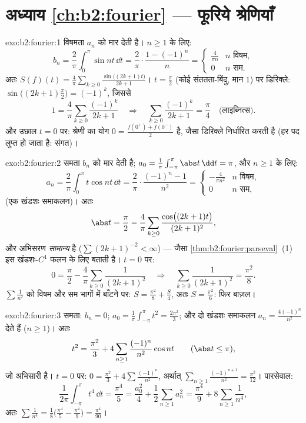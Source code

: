 \section*{अध्याय \ref{ch:b2:fourier} --- फूरिये श्रेणियाँ}

\begin{solution}{exo:b2:fourier:1}
विषमता $a_n$ को मार देती है। $n \geq 1$ के लिए:
\[
b_n = \frac{2}{\pi}\int_0^{\pi} \sin nt\,\dd t
= \frac{2}{\pi}\cdot\frac{1 - (-1)^n}{n}
= \begin{cases} \frac{4}{\pi n} & n \text{ विषम},\\ 0 & n
\text{ सम}. \end{cases}
\]
अतः $S(f)(t) = \frac{4}{\pi}\sum_{k\geq0} \frac{\sin\bigl((2k+1)t
\bigr)}{2k+1}$। $t = \frac\pi2$ (कोई संततता-बिंदु, मान $1$) पर डिरिक्ले: $\sin\bigl((2k+1)\frac\pi2\bigr) = (-1)^k$, जिससे
\[
1 = \frac4\pi \sum_{k\geq0}\frac{(-1)^k}{2k+1}
\quad\Longrightarrow\quad
\sum_{k\geq0}\frac{(-1)^k}{2k+1} = \frac{\pi}{4}
\quad\text{(लाइब्नित्स)}.
\]
और उछाल $t = 0$ पर: श्रेणी का योग $0 = \frac{f(0^+) +
f(0^-)}{2}$ है, जैसा डिरिक्ले निर्धारित करती है
(हर पद लुप्त हो जाता है: संगत)।
\end{solution}

\begin{solution}{exo:b2:fourier:2}
समता $b_n$ को मार देती है; $a_0 = \frac{1}{\pi}\int_{-\pi}^\pi\abs
t\,\dd t = \pi$, और $n \geq 1$ के लिए:
\[
a_n = \frac{2}{\pi}\int_0^\pi t\cos nt\,\dd t
= \frac{2}{\pi}\cdot\frac{(-1)^n - 1}{n^2}
= \begin{cases} -\frac{4}{\pi n^2} & n \text{ विषम},\\ 0 & n
\text{ सम}, \end{cases}
\]
(एक खंडशः समाकलन)। अतः
\[
\abs t = \frac{\pi}{2} - \frac{4}{\pi}\sum_{k\geq0}
\frac{\cos\bigl((2k+1)t\bigr)}{(2k+1)^2} ,
\]
और अभिसरण \emph{सामान्य} है ($\sum (2k+1)^{-2} < \infty$) --- जैसा \cref{thm:b2:fourier:parseval}~(1) इस  खंडशः-$C^1$
फलन के लिए बताती है। $t = 0$ पर:
\[
0 = \frac\pi2 - \frac4\pi\sum_{k\geq0}\frac{1}{(2k+1)^2}
\quad\Longrightarrow\quad
\sum_{k\geq0}\frac{1}{(2k+1)^2} = \frac{\pi^2}{8} .
\]
$\sum \frac{1}{n^2}$ को विषम और सम भागों में बाँटने पर: $S =
\frac{\pi^2}{8} + \frac S4$, अतः $S = \frac{\pi^2}{6}$: फिर बाज़ल।
\end{solution}

\begin{solution}{exo:b2:fourier:3}
समता: $b_n = 0$; $a_0 = \frac{1}{\pi}\int_{-\pi}^{\pi} t^2 =
\frac{2\pi^2}{3}$; और दो खंडशः समाकलन $a_n =
\frac{4(-1)^n}{n^2}$ देते हैं ($n \geq 1$)। अतः
\[
t^2 = \frac{\pi^2}{3} + 4\sum_{n\geq1}
\frac{(-1)^n}{n^2}\cos nt
\qquad (\abs t \leq \pi),
\]
जो  अभिसारी है। $t = 0$ पर: $0 = \frac{\pi^2}{3} +
4\sum\frac{(-1)^n}{n^2}$, अर्थात् $\sum_{n\geq1}
\frac{(-1)^{n+1}}{n^2} = \frac{\pi^2}{12}$। पारसेवाल:
\[
\frac{1}{2\pi}\int_{-\pi}^{\pi} t^4\,\dd t = \frac{\pi^4}{5}
= \frac{a_0^2}{4} + \frac12\sum_{n\geq1} a_n^2
= \frac{\pi^4}{9} + 8\sum_{n\geq1}\frac{1}{n^4} ,
\]
अतः $\sum \frac{1}{n^4} = \frac18\bigl(\frac{\pi^4}{5} -
\frac{\pi^4}{9}\bigr) = \frac{\pi^4}{90}$।
\end{solution}

